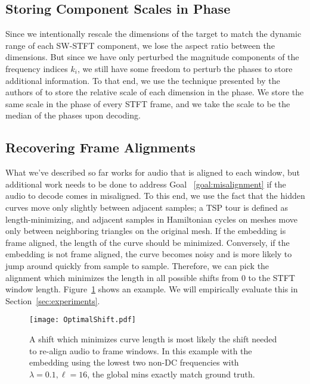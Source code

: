 \documentclass[runningheads]{llncs}
\begin{document}
\subsection{Storing Component Scales in Phase}
\label{sec:componentscales}

Since we intentionally rescale the dimensions of the target to match the dynamic range of each SW-STFT component, we lose the aspect ratio between the dimensions.  But since we have only perturbed the magnitude components of the frequency indices $k_i$, we still have some freedom to perturb the phases to store additional information.  To that end, we use the technique presented by the authors of \cite{xiaoxiao_dong_data_2004} to store the relative scale of each dimension in the phase.  We store the same scale in the phase of every STFT frame, and we take the scale to be the median of the phases upon decoding.

\subsection{Recovering Frame Alignments}
\label{sec:framealignments}

What we've described so far works for audio that is aligned to each window, but additional work needs to be done to address Goal ~\ref{goal:misalignment} if the audio to decode comes in misaligned.  To this end, we use the fact that the hidden curves move only slightly between adjacent samples; a TSP tour is defined as length-minimizing, and adjacent samples in Hamiltonian cycles on meshes move only between neighboring triangles on the original mesh.  If the embedding is frame aligned, the length of the curve should be minimized.  Conversely, if the embedding is not frame aligned, the curve becomes noisy and is more likely to jump around quickly from sample to sample.  Therefore, we can pick the alignment which minimizes the length in all possible shifts from $0$ to the STFT window length.  Figure~\ref{fig:FrameAlignments} shows an example.  We will empirically evaluate this in Section~\ref{sec:experiments}.


\begin{figure}
  \centering
  \texttt{[image: OptimalShift.pdf]}
  \caption{A shift which minimizes curve length is most likely the shift needed to re-align audio to frame windows.  In this example with the embedding using the lowest two non-DC frequencies with $\lambda=0.1, \ell=16$, the global mins exactly match ground truth.}
  \label{fig:FrameAlignments}
\end{figure}
\end{document}
